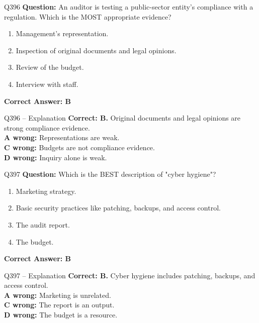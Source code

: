 \documentclass[aspectratio=169,10pt]{beamer}
\begin{document}
	\begin{frame}[t]{Q396}
		\small
		\textbf{Question:} An auditor is testing a public-sector entity's compliance with a regulation. Which is the MOST appropriate evidence?
		\begin{enumerate}[label=\Alph*.,itemsep=1pt,topsep=2pt]
			\item Management's representation.
			\item Inspection of original documents and legal opinions.
			\item Review of the budget.
			\item Interview with staff.
		\end{enumerate}
		\vspace{4pt}
		\textbf{Correct Answer: B}
	\end{frame}
	
	\begin{frame}[t]{Q396 -- Explanation}
		\small
		\textbf{Correct: B.} Original documents and legal opinions are strong compliance evidence. \\[4pt]
		\textbf{A wrong:} Representations are weak. \\[2pt]
		\textbf{C wrong:} Budgets are not compliance evidence. \\[2pt]
		\textbf{D wrong:} Inquiry alone is weak.
	\end{frame}
	
	\begin{frame}[t]{Q397}
		\small
		\textbf{Question:} Which is the BEST description of "cyber hygiene"?
		\begin{enumerate}[label=\Alph*.,itemsep=1pt,topsep=2pt]
			\item Marketing strategy.
			\item Basic security practices like patching, backups, and access control.
			\item The audit report.
			\item The budget.
		\end{enumerate}
		\vspace{4pt}
		\textbf{Correct Answer: B}
	\end{frame}
	
	\begin{frame}[t]{Q397 -- Explanation}
		\small
		\textbf{Correct: B.} Cyber hygiene includes patching, backups, and access control. \\[4pt]
		\textbf{A wrong:} Marketing is unrelated. \\[2pt]
		\textbf{C wrong:} The report is an output. \\[2pt]
		\textbf{D wrong:} The budget is a resource.
	\end{frame}
	
\end{document}
